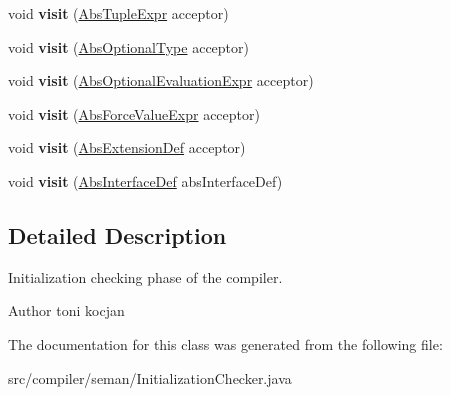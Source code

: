 \begin{DoxyCompactItemize}
\item 
\mbox{\label{classcompiler_1_1seman_1_1_initialization_checker_ae7c2f16b91cf0ea42c472ed7f3d616e2}} 
void {\bfseries visit} (\hyperlink{classcompiler_1_1abstr_1_1tree_1_1expr_1_1_abs_tuple_expr}{Abs\+Tuple\+Expr} acceptor)
\item 
\mbox{\label{classcompiler_1_1seman_1_1_initialization_checker_aa58de48b5b93c8012eab6c3ce4c3feba}} 
void {\bfseries visit} (\hyperlink{classcompiler_1_1abstr_1_1tree_1_1type_1_1_abs_optional_type}{Abs\+Optional\+Type} acceptor)
\item 
\mbox{\label{classcompiler_1_1seman_1_1_initialization_checker_a09ba7213ee698185c2e688ce6b1ead81}} 
void {\bfseries visit} (\hyperlink{classcompiler_1_1abstr_1_1tree_1_1expr_1_1_abs_optional_evaluation_expr}{Abs\+Optional\+Evaluation\+Expr} acceptor)
\item 
\mbox{\label{classcompiler_1_1seman_1_1_initialization_checker_a71128eb1575870eefcb0fc93138ec73c}} 
void {\bfseries visit} (\hyperlink{classcompiler_1_1abstr_1_1tree_1_1expr_1_1_abs_force_value_expr}{Abs\+Force\+Value\+Expr} acceptor)
\item 
\mbox{\label{classcompiler_1_1seman_1_1_initialization_checker_ae6f48a4a6fc5d8dd486756261b629cd8}} 
void {\bfseries visit} (\hyperlink{classcompiler_1_1abstr_1_1tree_1_1def_1_1_abs_extension_def}{Abs\+Extension\+Def} acceptor)
\item 
\mbox{\label{classcompiler_1_1seman_1_1_initialization_checker_a22bccd9ad220962c126480db90b67192}} 
void {\bfseries visit} (\hyperlink{classcompiler_1_1abstr_1_1tree_1_1def_1_1_abs_interface_def}{Abs\+Interface\+Def} abs\+Interface\+Def)
\end{DoxyCompactItemize}


\subsection{Detailed Description}
Initialization checking phase of the compiler. \begin{DoxyAuthor}{Author}
toni kocjan 
\end{DoxyAuthor}


The documentation for this class was generated from the following file\+:\begin{DoxyCompactItemize}
\item 
src/compiler/seman/Initialization\+Checker.\+java\end{DoxyCompactItemize}
